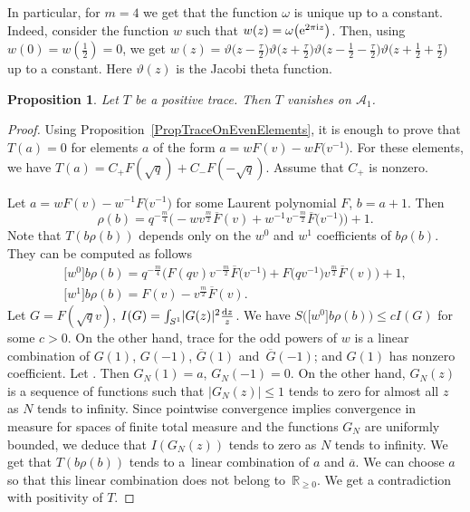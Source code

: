 \documentclass[pdftex]{sigma}
\newcommand{\ovl}{\overline}
\numberwithin{equation}{section}
\newtheorem{Proposition}[Theorem]{Proposition}
\theoremstyle{definition}
\begin{document}
 In particular, for $m=4$ we get that the function $\omega$ is unique up to a constant. Indeed, consider the function $w$ such that $w(z)=\omega\bigl({\rm e}^{2\pi {\rm i} z}\bigr)$. Then, using $w(0)=w(\tfrac12)=0$, we get $w(z)=\vartheta\bigl(z-\frac{\tau}{2}\bigr)\vartheta\bigl(z+\frac{\tau}{2}\bigr)\vartheta\bigl(z-\tfrac12-\frac{\tau}{2}\bigr)\vartheta\bigl(z+\frac{1}{2}+\frac{\tau}{2}\bigr)$ up to a constant. Here $\vartheta(z)$ is the Jacobi theta function.
\begin{Proposition}
\label{PropPositiveTraceIsZeroOnOddElements}
 Let $T$ be a positive trace. Then $T$ vanishes on $\mathcal{A}_1$.
\end{Proposition}
 \begin{proof}
 Using Proposition~\ref{PropTraceOnEvenElements}, it is enough to prove that $T(a)=0$ for elements $a$ of the form $a=wF(v)-wF\bigl(v^{-1}\bigr)$. For these elements, we have $T(a)=C_+F(\sqrt{q})+C_-F(-\sqrt{q})$. Assume that $C_+$ is nonzero.

 Let $a=wF(v)-w^{-1}F\bigl(v^{-1}\bigr)$ for some Laurent polynomial $F$, $b=a+1$. Then \[\rho(b)=q^{-\frac{m}{4}}\bigl(-wv^{\frac{m}{2}}\ovl{F}(v)+w^{-1}v^{-\frac{m}{2}}\ovl{F}\bigl(v^{-1}\bigr)\bigr)+1.\]
 Note that $T(b\rho(b))$ depends only on the $w^0$ and $w^1$ coefficients of $b\rho(b)$. They can be computed as follows
 \begin{gather*}
 \big[w^0\big]b\rho(b)=q^{-\frac{m}{4}}\bigl(F(qv)v^{-\frac{m}{2}}\ovl{F}\bigl(v^{-1}\bigr)+F\bigl(qv^{-1}\bigr)v^{\frac{m}{2}}\ovl{F}(v)\bigr)+1,\\
 \big[w^1\big]b\rho(b)=F(v)-v^{\frac{m}{2}}\ovl{F}(v).
 \end{gather*}
 Let $G=F(\sqrt{q}v)$, $I(G)=\int_{S^1}\lvert G(z)\rvert^2 \frac{{\rm d}z}{z}$. We have $S\bigl(\big[w^0\big]b\rho(b)\bigr)\leq cI(G)$ for some $c>0$. On the other hand, trace for the odd powers of $w$ is a linear combination of $G(1)$, $G(-1)$, $\ovl{G}(1)$ and~$\ovl{G}(-1)$; and $G(1)$ has nonzero coefficient. Let . Then $G_N(1)=a$, $G_N(-1)=0$. On the other hand, $G_N(z)$ is a sequence of functions such that $\lvert G_N(z)\rvert\leq 1$ tends to zero for almost all $z$ as $N$ tends to infinity. Since pointwise convergence implies convergence in measure for spaces of finite total measure and the functions $G_N$ are uniformly bounded, we deduce that $I(G_N(z))$ tends to zero as $N$ tends to infinity. We get that $T(b\rho(b))$ tends to a~linear combination of $a$ and $\ovl{a}$. We can choose $a$ so that this linear combination does not belong to~$\mathbb{R}_{\geq 0}$. We get a contradiction with positivity of $T$.
 \end{proof}
\end{document}
